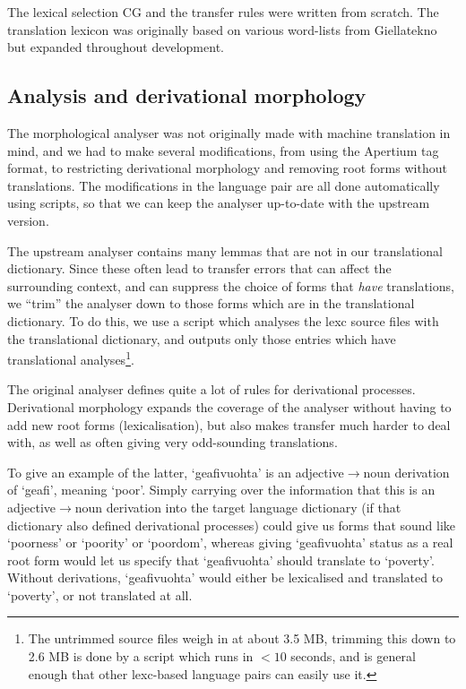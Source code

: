 The lexical selection CG and the transfer rules were written from
scratch. The translation lexicon was originally based on various
word-lists from Giellatekno but expanded throughout development.
\subsection{Analysis and derivational morphology}
The morphological analyser was not originally made with machine
translation in mind, and we had to make several modifications, from
using the Apertium tag format, to restricting derivational morphology
and removing root forms without translations. The modifications in the
language pair are all done automatically using scripts, so that we can
keep the analyser up-to-date with the upstream version.

The upstream analyser contains many lemmas that are not in our
translational dictionary. Since these often lead to transfer errors
that can affect the surrounding context, and can suppress the choice
of forms that \textit{have} translations, we ``trim'' the analyser
down to those forms which are in the translational dictionary. To do
this, we use a script which analyses the lexc source files with the
translational dictionary, and outputs only those entries which have
translational analyses\footnote{The untrimmed source files weigh in at
  about 3.5 MB, trimming this down to 2.6 MB is done by a script which
  runs in $<10$ seconds, and is general enough that other lexc-based
  language pairs can easily use it.}.

The original analyser defines quite a lot of rules for derivational
processes. Derivational morphology expands the coverage of the
analyser without having to add new root forms (lexicalisation), but
also makes transfer much harder to deal with, as well as often giving
very odd-sounding translations.

To give an example of the latter, `geafivuohta' is an 
adjective$\rightarrow{}$noun derivation of `geafi', meaning `poor'.
Simply carrying over the information that this is an
adjective$\rightarrow{}$noun derivation into the target language
dictionary (if that dictionary also defined derivational processes)
could give us forms that sound like `poorness' or `poority' or
`poordom', whereas giving `geafivuohta' status as a real root form
would let us specify that `geafivuohta' should translate to `poverty'.
Without derivations, `geafivuohta' would either be lexicalised and
translated to `poverty', or not translated at all.

